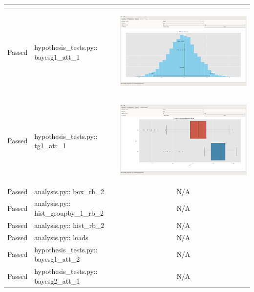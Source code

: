 \documentclass[11pt]{report}
\begin{document}
\begin{longtable}{|l|p{4.4cm}|C|}
\begin{center}
\end{center}\\
\hline
\color{ForestGreen}Passed & hypothesis\_tests.py:: bayesg1\_att\_1 & \begin{center}
\includegraphics[width=.9\linewidth]{./images/Screenshots/hypothesis_bayestest_g1_att_1.png}
\end{center}\\
\hline
\color{ForestGreen}Passed & hypothesis\_tests.py:: tg1\_att\_1 & \begin{center}
\includegraphics[width=.9\linewidth]{./images/Screenshots/hypothesis_ttest_g1_att_1.png}
\end{center}\\
\hline
\color{ForestGreen}Passed & analysis.py:: box\_rb\_2 & N/A\\
\hline
\color{ForestGreen}Passed & analysis.py:: hist\_groupby\_1\_rb\_2 & N/A\\
\hline
\color{ForestGreen}Passed & analysis.py:: hist\_rb\_2 & N/A\\
\hline
\color{ForestGreen}Passed & analysis.py:: loads & N/A\\
\hline
\color{ForestGreen}Passed & hypothesis\_tests.py:: bayesg1\_att\_2 & N/A\\
\hline
\color{ForestGreen}Passed & hypothesis\_tests.py:: bayesg2\_att\_1 & N/A\\

\end{longtable}
\end{document}
